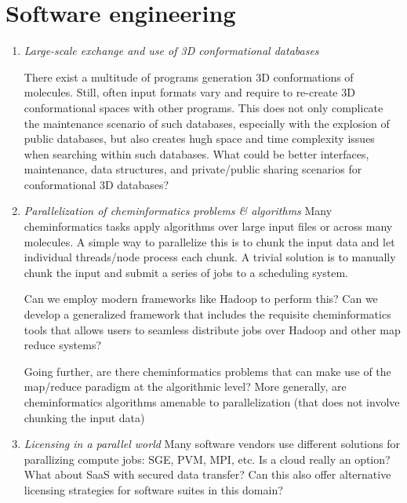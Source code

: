 \documentclass{sig-alternate}
\begin{document}
\section*{Software engineering}
\begin{enumerate}
\item \emph{Large-scale exchange and use of 3D conformational databases}

  There exist a multitude of programs generation 3D conformations of
  molecules. Still, often input formats vary and require to re-create
  3D conformational spaces with other programs. This does not only
  complicate the maintenance scenario of such databases, especially
  with the explosion of public databases, but also creates hugh space
  and time complexity issues when searching within such
  databases. What could be better interfaces, maintenance, data
  structures, and private/public sharing scenarios for conformational
  3D databases? 

\item \emph{Parallelization of cheminformatics problems \& algorithms}
Many cheminformatics tasks apply algorithms over large input files or
across many molecules. A simple way to parallelize this is to chunk
the input data and let individual threads/node process each chunk. A
trivial solution is to manually chunk the input and submit a series of
jobs to a scheduling system.

Can we employ modern frameworks like Hadoop to perform this? Can we
develop a generalized framework that includes the requisite
cheminformatics tools that allows users to seamless distribute jobs
over Hadoop and other map reduce systems?

Going further, are there cheminformatics problems that can make use of
the map/reduce paradigm at the algorithmic level? More generally, are
cheminformatics algorithms amenable to parallelization (that does not
involve chunking the input data)

\item \emph{Licensing in a parallel world} Many software vendors use
  different solutions for parallizing compute jobs: SGE, PVM, MPI,
  etc.  Is a cloud really an option?  What about SaaS with secured data
  transfer?  Can this also offer alternative licensing strategies for
  software suites in this domain?

\end{enumerate}
\end{document}
